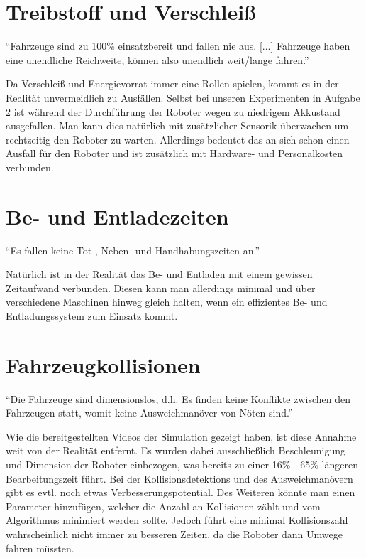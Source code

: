 \documentclass[ngerman]{tudscrreprt}
\begin{document}
\section{Treibstoff und Verschleiß}
\begin{displayquote}
    ``Fahrzeuge sind zu 100\% einsatzbereit und fallen nie aus. [...] Fahrzeuge haben eine unendliche Reichweite, können also unendlich weit/lange fahren.'' \cite{aufgabenstellung}
\end{displayquote}
%
Da Verschleiß und Energievorrat immer eine Rollen spielen, kommt es in der Realität unvermeidlich zu Ausfällen. Selbst bei unseren Experimenten in Aufgabe 2 ist während der Durchführung der Roboter wegen zu niedrigem Akkustand ausgefallen. Man kann dies natürlich mit zusätzlicher Sensorik überwachen um rechtzeitig den Roboter zu warten. Allerdings bedeutet das an sich schon einen Ausfall für den Roboter und ist zusätzlich mit Hardware- und Personalkosten verbunden.

\section{Be- und Entladezeiten}
\begin{displayquote}
    ``Es fallen keine Tot-, Neben- und Handhabungszeiten an.'' \cite{aufgabenstellung}
\end{displayquote}
%
Natürlich ist in der Realität das Be- und Entladen mit einem gewissen Zeitaufwand verbunden. Diesen kann man allerdings minimal und über verschiedene Maschinen hinweg gleich halten, wenn ein effizientes Be- und Entladungssystem zum Einsatz kommt.

\section{Fahrzeugkollisionen}
\begin{displayquote}
    ``Die Fahrzeuge sind dimensionslos, d.h. Es finden keine Konflikte zwischen den Fahrzeugen statt, womit keine Ausweichmanöver von Nöten sind.'' \cite{aufgabenstellung}
\end{displayquote}
%
Wie die bereitgestellten Videos der Simulation gezeigt haben, ist diese Annahme weit von der Realität entfernt. Es wurden dabei ausschließlich Beschleunigung und Dimension der Roboter einbezogen, was bereits zu einer 16\% - 65\% längeren Bearbeitungszeit führt. Bei der Kollisionsdetektions und des Ausweichmanövern gibt es evtl. noch etwas Verbesserungspotential. Des Weiteren könnte man einen Parameter hinzufügen, welcher die Anzahl an Kollisionen zählt und vom Algorithmus minimiert werden sollte. Jedoch führt eine minimal Kollisionszahl wahrscheinlich nicht immer zu besseren Zeiten, da die Roboter dann Umwege fahren müssten.
\end{document}
